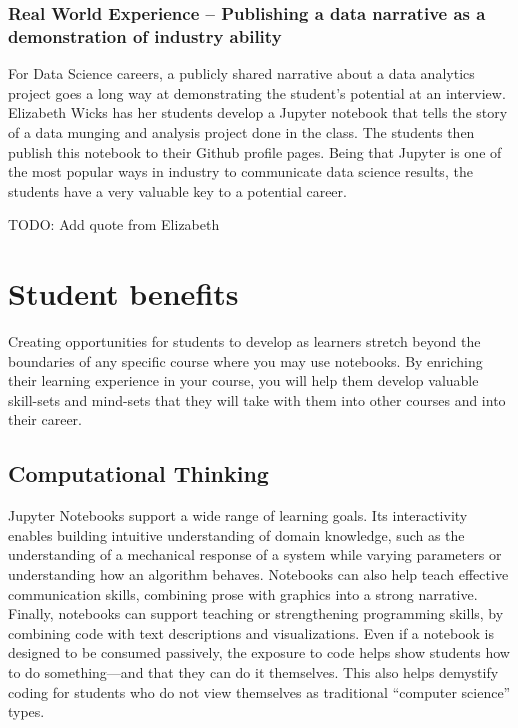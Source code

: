 \documentclass[]{book}
\begin{document}
\subsubsection{Real World Experience -- Publishing a data narrative as a
demonstration of industry
ability}\label{real-world-experience-publishing-a-data-narrative-as-a-demonstration-of-industry-ability}

For Data Science careers, a publicly shared narrative about a data
analytics project goes a long way at demonstrating the student's
potential at an interview. Elizabeth Wicks has her students develop a
Jupyter notebook that tells the story of a data munging and analysis
project done in the class. The students then publish this notebook to
their Github profile pages. Being that Jupyter is one of the most
popular ways in industry to communicate data science results, the
students have a very valuable key to a potential career.

TODO: Add quote from Elizabeth

\section{Student benefits}\label{student-benefits}

Creating opportunities for students to develop as learners stretch
beyond the boundaries of any specific course where you may use
notebooks. By enriching their learning experience in your course, you
will help them develop valuable skill-sets and mind-sets that they will
take with them into other courses and into their career.

\subsection{Computational Thinking}\label{computational-thinking}

Jupyter Notebooks support a wide range of learning goals. Its
interactivity enables building intuitive understanding of domain
knowledge, such as the understanding of a mechanical response of a
system while varying parameters or understanding how an algorithm
behaves. Notebooks can also help teach effective communication skills,
combining prose with graphics into a strong narrative. Finally,
notebooks can support teaching or strengthening programming skills, by
combining code with text descriptions and visualizations. Even if a
notebook is designed to be consumed passively, the exposure to code
helps show students how to do something---and that they can do it
themselves. This also helps demystify coding for students who do not
view themselves as traditional ``computer science'' types.
\end{document}
